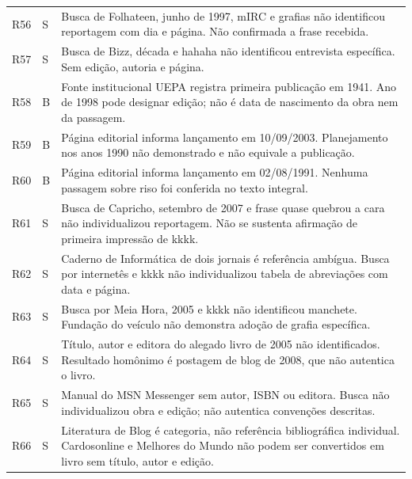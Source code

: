 \begin{longtable}{p{}p{}p{}}
R56 & S & Busca de Folhateen, junho de 1997, mIRC e grafias não identificou reportagem com dia e página. Não confirmada a frase recebida.\\
R57 & S & Busca de Bizz, década e hahaha não identificou entrevista específica. Sem edição, autoria e página.\\
R58 & B & Fonte institucional UEPA registra primeira publicação em 1941. Ano de 1998 pode designar edição; não é data de nascimento da obra nem da passagem.\\
R59 & B & Página editorial informa lançamento em 10/09/2003. Planejamento nos anos 1990 não demonstrado e não equivale a publicação.\\
R60 & B & Página editorial informa lançamento em 02/08/1991. Nenhuma passagem sobre riso foi conferida no texto integral.\\
R61 & S & Busca de Capricho, setembro de 2007 e frase quase quebrou a cara não individualizou reportagem. Não se sustenta afirmação de primeira impressão de kkkk.\\
R62 & S & Caderno de Informática de dois jornais é referência ambígua. Busca por internetês e kkkk não individualizou tabela de abreviações com data e página.\\
R63 & S & Busca por Meia Hora, 2005 e kkkk não identificou manchete. Fundação do veículo não demonstra adoção de grafia específica.\\
R64 & S & Título, autor e editora do alegado livro de 2005 não identificados. Resultado homônimo é postagem de blog de 2008, que não autentica o livro.\\
R65 & S & Manual do MSN Messenger sem autor, ISBN ou editora. Busca não individualizou obra e edição; não autentica convenções descritas.\\
R66 & S & Literatura de Blog é categoria, não referência bibliográfica individual. Cardosonline e Melhores do Mundo não podem ser convertidos em livro sem título, autor e edição.\\
\bottomrule\end{longtable}\normalsize
